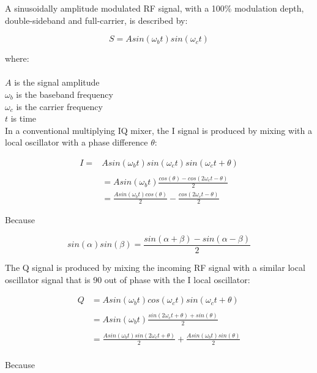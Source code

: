 \documentclass[11pt, twoside]{article}
\begin{document}
A sinusoidally amplitude modulated RF signal, with a 100\% modulation
depth, double-sideband and full-carrier, is described by:

\begin{equation}
S = A sin({\omega_b}t) sin({\omega_c}t)
\end{equation}

where:\\
\\
$A$ is the signal amplitude\\
$\omega_b$ is the baseband frequency\\
$\omega_c$ is the carrier frequency \\
  $t$ is time\\

In a conventional multiplying IQ mixer, the I signal is produced by
mixing with a local oscillator with a phase difference $\theta$:

\begin{align*}
I =& A sin({\omega_b}t)  sin({\omega}_ct)sin({\omega}_ct + \theta) \\
\\
&= A sin({\omega_b}t)  \frac{cos(\theta) - cos(2 {\omega}_ct - \theta)}{2}
\\
&= \frac{A sin({\omega_b}t) cos(\theta)}{2} - \frac{cos(2 {\omega_c}t - \theta)}{2}
\end{align*}

Because

\begin{equation*}
  sin(\alpha) sin(\beta) = \frac{sin(\alpha + \beta) - sin(\alpha - \beta)}{2}
\end{equation*}

The Q signal is produced by mixing the incoming RF signal with a
similar local oscillator signal that is 90{\degree} out of phase with
the I local oscillator:


\begin{align*}
  Q& = A sin({\omega_b}t) cos({\omega}_ct) sin({\omega}_ct + \theta) \\
  \\
  & = A sin({\omega_b}t) \frac{sin(2{\omega}_ct + \theta) + sin(\theta)}{2}\\
  \\
& = \frac{A sin({\omega_b}t)sin(2{\omega}_ct + \theta)}{2} + \frac{A sin({\omega_b}t)sin(\theta)}{2}\\
\end{align*}

Because
\end{document}
